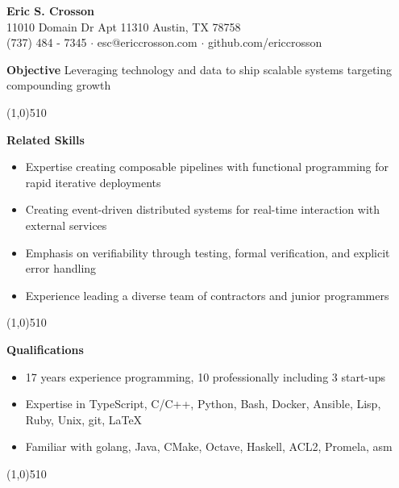 \documentclass{report}
\newcommand{\cut}{\begin{center} \line(1,0){510} \end{center}}
\begin{document}
\pagestyle{empty}
\setlength\parindent{0pt}

\begin{center}
  \textbf{Eric S. Crosson} \\
  11010 Domain Dr Apt 11310 Austin, TX 78758 \\
  (737) 484 - 7345 $\cdot$ esc@ericcrosson.com $\cdot$ github.com/ericcrosson
\end{center}

\textbf{Objective} \hspace{1mm} Leveraging technology and data to ship
scalable systems targeting compounding growth

\cut{}

\textbf{Related Skills}
\begin{itemize}[label=$\cdot$]
\item Expertise creating composable pipelines with functional programming for rapid iterative deployments
\item Creating event-driven distributed systems for real-time interaction with external services
\item Emphasis on verifiability through testing, formal verification, and explicit error handling
\item Experience leading a diverse team of contractors and junior programmers
\end{itemize}

\cut{}

\textbf{Qualifications}
\begin{itemize}[label=$\cdot$]
\item 17 years experience programming, 10 professionally including 3 start-ups
\item Expertise in TypeScript, C/C++, Python, Bash, Docker, Ansible, Lisp, Ruby, Unix, git, \LaTeX{}
\item Familiar with golang, Java, CMake, Octave, Haskell, ACL2, Promela, asm
\end{itemize}

\cut{}
\end{document}
